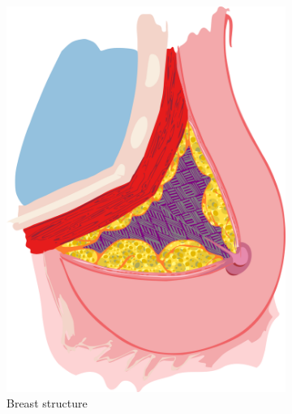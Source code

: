 \begin{figure}
    \centering
    \begin{subfigure}[b]{0.2\textwidth}
        \centering
        \includegraphics[width=\textwidth]{breast}
        \caption{{\small Breast structure}}    
        \label{fig:lesions:breast}
    \end{subfigure}
    \hfill
    \begin{subfigure}[b]{0.2\textwidth}  
        \centering 

\end{subfigure}
\end{figure}
